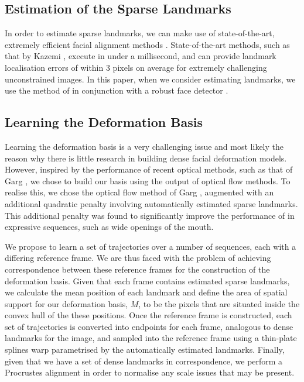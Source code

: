 \subsection{Estimation of the Sparse Landmarks}
In order to estimate sparse landmarks, we can make use of state-of-the-art, extremely
efficient facial alignment methods \cite{kazemi2014one,asthana2014incremental,menpo14,alabort2014bayesian}.
State-of-the-art methods, such as that by Kazemi \etal \cite{kazemi2014one},
execute in under a millisecond, and can provide landmark localisation errors
of within 3 pixels on average for extremely challenging unconstrained images.
In this paper, when we consider estimating landmarks, we use the method of 
\cite{kazemi2014one} in conjunction with a robust face detector \cite{zafeiriou2015survey}.
\subsection{Learning the Deformation Basis}\label{subsec:learning_deformation}
Learning the deformation basis is a very challenging issue and most likely the reason
why there is little research in building dense facial deformation models. However,
inspired by the performance of recent optical methods, such as that of Garg \etal \cite{garg2013variational},
we chose to build our basis using the output of optical flow methods. To realise this,
we chose the optical flow method of Garg \etal \cite{garg2013variational}, augmented with
an additional quadratic penalty involving automatically estimated sparse landmarks.
This additional penalty was found to significantly improve the performance of 
\cite{garg2013variational} in expressive sequences, such as wide openings of the mouth.

We propose to learn a set of trajectories over a number of sequences, each with
a differing reference frame. We are thus faced with the problem
of achieving correspondence between these reference frames for the construction
of the deformation basis. Given that each frame contains estimated sparse landmarks,
we calculate the mean position of each landmark and define the area of spatial support
for our deformation basis, $M$, to be the pixels that are situated inside the
convex hull of the these positions. Once the reference frame is constructed,
each set of trajectories is converted into endpoints for each frame, analogous
to dense landmarks for the image, and sampled into the reference frame using
a thin-plate splines warp parametrised by the automatically estimated landmarks.
Finally, given that we have a set of dense landmarks in correspondence, we perform a 
Procrustes alignment in order to normalise any scale issues that may be present.
